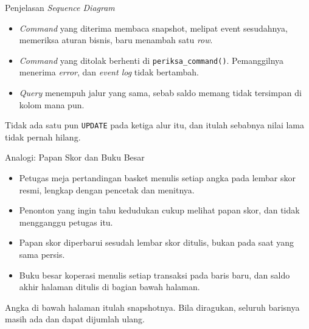 \documentclass[aspectratio=169, table, 12pt]{beamer}
\begin{document}
\begin{frame}{{\Large Penjelasan \textit{Sequence Diagram}}}
  \vspace{10pt}
  \begin{itemize}\small
    \item \textit{Command} yang diterima membaca snapshot, melipat event
          sesudahnya, memeriksa aturan bisnis, baru menambah satu \textit{row}.
    \item \textit{Command} yang ditolak berhenti di \texttt{periksa\_command()}.
          Pemanggilnya menerima \textit{error}, dan \textit{event log} tidak
          bertambah.
    \item \textit{Query} menempuh jalur yang sama, sebab saldo memang tidak
          tersimpan di kolom mana pun.
  \end{itemize}

  \vspace{10pt}
  {\small Tidak ada satu pun \texttt{UPDATE} pada ketiga alur itu, dan itulah
  sebabnya nilai lama tidak pernah hilang.}
\end{frame}

\begin{frame}{{\Large Analogi: Papan Skor dan Buku Besar}}
  \vspace{10pt}
  \begin{itemize}\small
    \item Petugas meja pertandingan basket menulis setiap angka pada lembar
          skor resmi, lengkap dengan pencetak dan menitnya.
    \item Penonton yang ingin tahu kedudukan cukup melihat papan skor, dan
          tidak mengganggu petugas itu.
    \item Papan skor diperbarui sesudah lembar skor ditulis, bukan pada saat
          yang sama persis.
    \item Buku besar koperasi menulis setiap transaksi pada baris baru, dan
          saldo akhir halaman ditulis di bagian bawah halaman.
  \end{itemize}

  \vspace{10pt}
  {\small Angka di bawah halaman itulah snapshotnya. Bila diragukan, seluruh
  barisnya masih ada dan dapat dijumlah ulang.}
\end{frame}
\end{document}
